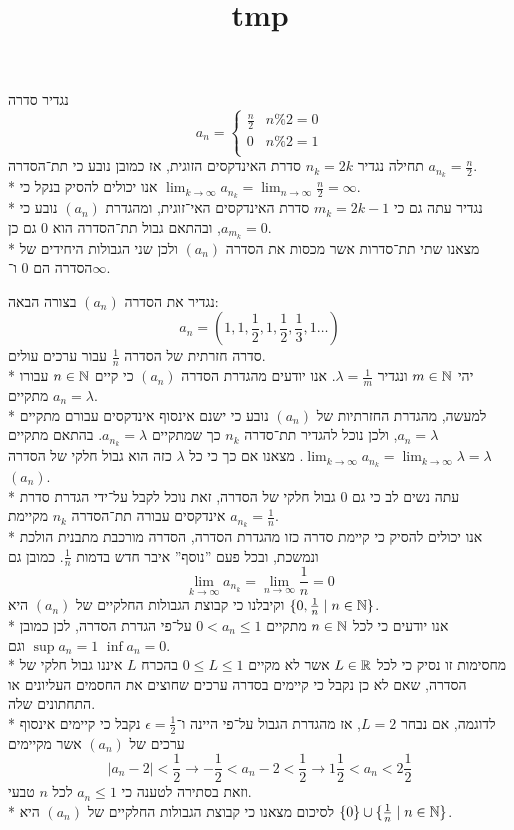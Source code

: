 
\title{tmp}



\Question{}
\Subquestion{}
נגדיר סדרה
\[
	a_n = \begin{cases}
		\frac{n}{2} & n \% 2 = 0 \\
		0 & n \% 2 = 1 \\
	\end{cases}
\]
תחילה נגדיר $n_k = 2k$ סדרת האינדקסים הזוגית, אז כמובן נובע כי תת־הסדרה $a_{n_k} = \frac{n}{2}$. \\*
אנו יכולים להסיק בנקל כי $\lim_{k \to \infty} a_{n_k} = \lim_{n \to \infty} \frac{n}{2} = \infty$. \\*
נגדיר עתה גם כי $m_k = 2k - 1$ סדרת האינדקסים האי־זוגית, ומהגדרת $(a_n)$ נובע כי $a_{m_k} = 0$, ובהתאם גבול תת־הסדרה הוא $0$ גם כן. \\*
מצאנו שתי תת־סדרות אשר מכסות את הסדרה $(a_n)$ ולכן שני הגבולות היחידים של הסדרה הם $0$ ו־$\infty$.

\Subquestion{}
נגדיר את הסדרה $(a_n)$ בצורה הבאה:
\[
	a_n = (1, 1, \frac{1}{2}, 1, \frac{1}{2}, \frac{1}{3}, 1 \dots)
\]
סדרה חזרתית של הסדרה $\frac{1}{n}$ עבור ערכים עולים. \\*
יהי $m \in \mathbb{N}$ ונגדיר $\lambda = \frac{1}{m}$. אנו יודעים מהגדרת הסדרה $(a_n)$ כי קיים $n \in \mathbb{N}$ עבורו מתקיים $a_n = \lambda$. \\*
למעשה, מהגדרת החזרתיות של $(a_n)$ נובע כי ישנם אינסוף אינדקסים עבורם מתקיים $a_n = \lambda$,
ולכן נוכל להגדיר תת־סדרה $n_k$ כך שמתקיים $a_{n_k} = \lambda$. בהתאם מתקיים $\lim_{k \to \infty} a_{n_k} = \lim_{k \to \infty} \lambda = \lambda$.
מצאנו אם כך כי כל $\lambda$ כזה הוא גבול חלקי של הסדרה $(a_n)$. \\*
עתה נשים לב כי גם $0$ גבול חלקי של הסדרה, זאת נוכל לקבל על־ידי הגדרת סדרת אינדקסים עבורה תת־הסדרה $n_k$ מקיימת $a_{n_k} = \frac{1}{n}$. \\*
אנו יכולים להסיק כי קיימת סדרה כזו מהגדרת הסדרה, הסדרה מורכבת מתבנית הולכת ונמשכת, ובכל פעם ''נוסף'' איבר חדש בדמות $\frac{1}{n}$. כמובן גם
\[
	\lim_{k \to \infty} a_{n_k} = \lim_{n \to \infty} \frac{1}{n} = 0
\]
וקיבלנו כי קבוצת הגבולות החלקיים של $(a_n)$ היא $\{ 0, \frac{1}{n} \mid n \in \mathbb{N} \}$. \\*
אנו יודעים כי לכל $n \in \mathbb{N}$ מתקיים $0 < a_n \le 1$ על־פי הגדרת הסדרה, לכן כמובן $\sup a_n = 1$ וגם $\inf a_n = 0$. \\*
מחסימות זו נסיק כי לכל $L \in \mathbb{R}$ אשר לא מקיים $0 \le L \le 1$ בהכרח $L$ איננו גבול חלקי של הסדרה, 
שאם לא כן נקבל כי קיימים בסדרה ערכים שחוצים את החסמים העליונים או התחתונים שלה. \\*
לדוגמה, אם נבחר $L = 2$, אז מהגדרת הגבול על־פי היינה ו־$\epsilon = \frac{1}{2}$ נקבל כי קיימים אינסוף ערכים של $(a_n)$ אשר מקיימים
\[
	| a_n - 2 | < \frac{1}{2} \rightarrow -\frac{1}{2} < a_n - 2 < \frac{1}{2} \rightarrow 1 \frac{1}{2} < a_n < 2 \frac{1}{2}
\]
וזאת בסתירה לטענה כי $a_n \le 1$ לכל $n$ טבעי. \\*
לסיכום מצאנו כי קבוצת הגבולות החלקיים של $(a_n)$ היא $\{ 0 \} \cup \{ \frac{1}{n} \mid n \in \mathbb{N} \}$.



